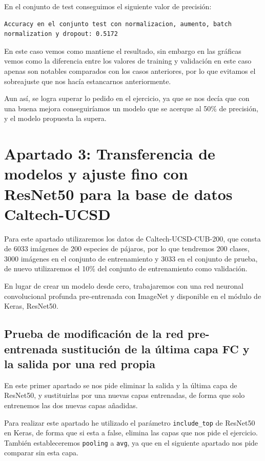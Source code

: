 \documentclass[12pt, spanish]{article}
\begin{document}
En el conjunto de test conseguimos el siguiente valor de precisión:

\begin{lstlisting}
Accuracy en el conjunto test con normalizacion, aumento, batch normalization y dropout: 0.5172
\end{lstlisting}

En este caso vemos como mantiene el resultado, sin embargo en las gráficas vemos como la diferencia entre los valores de training y validación en este caso apenas son notables comparados con los casos anteriores, por lo que evitamos el sobreajuste que nos hacía estancarnos anteriormente.

Aun así, se logra superar lo pedido en el ejercicio, ya que se nos decía que con una buena mejora conseguiríamos un modelo que se acerque al 50\% de precisión, y el modelo propuesta la supera.



\newpage






\section{Apartado 3: Transferencia de modelos y ajuste fino con ResNet50 para la base de datos Caltech-UCSD}

Para este apartado utilizaremos los datos de Caltech-UCSD-CUB-200\cite{cub200}, que consta de 6033 imágenes de 200 especies de pájaros, por lo que tendremos 200 clases, 3000 imágenes en el conjunto de entrenamiento y 3033 en el conjunto de prueba, de nuevo utilizaremos el 10\% del conjunto de entrenamiento como validación.

En lugar de crear un modelo desde cero, trabajaremos con una red neuronal convolucional profunda pre-entrenada con ImageNet y disponible en el módulo de Keras, ResNet50\cite{resnet50}.


\subsection{Prueba de modificación de la red pre-entrenada sustitución de la última capa FC y la salida por una red propia}

En este primer apartado se nos pide eliminar la salida y la última capa de ResNet50, y sustituirlas por una nuevas capas entrenadas, de forma que solo entrenemos las dos nuevas capas añadidas.

Para realizar este apartado he utilizado el parámetro \texttt{include\_top} de ResNet50 en Keras, de forma que si esta a false, elimina las capas que nos pide el ejercicio. También estableceremos \texttt{pooling} a \texttt{avg}, ya que en el siguiente apartado nos pide comparar sin esta capa.
\end{document}
